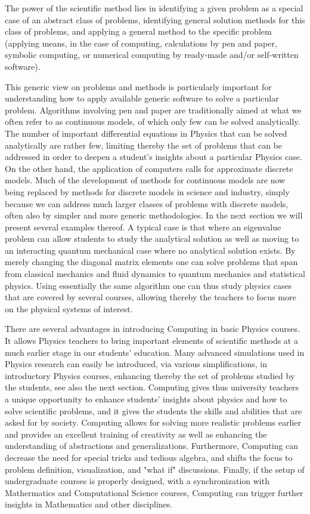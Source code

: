 \documentclass[graybox,envcountchap,sectrefs]{svmult}
\begin{document}
The power of the scientific method lies in identifying a given problem
as a special case of an abstract class of problems, identifying
general solution methods for this class of problems, and applying a
general method to the specific problem (applying means, in the case of
computing, calculations by pen and paper, symbolic computing, or
numerical computing by ready-made and/or self-written software). 

This generic view on problems and methods is particularly important for
understanding how to apply available generic software to solve a
particular problem.  Algorithms involving pen and paper are
traditionally aimed at what we often refer to as continuous models, of
which only few can be solved analytically. The number of important
differential equations in Physics that can be solved analytically are
rather few, limiting thereby the set of problems that can be addressed
in order to deepen a student's insights about a particular Physics
case. On the other hand, the application of computers calls for
approximate discrete models.  Much of the development of methods for
continuous models are now being replaced by methods for discrete
models in science and industry, simply because we can address much
larger classes of problems with discrete models, often also by simpler
and more generic methodologies.  In the next section we will present
several examples thereof. A typical case is that where an eigenvalue
problem can allow students to study the analytical solution as well as
moving to an interacting quantum mechanical case where no analytical
solution exists. By merely changing the diagonal matrix elements one
can solve problems that span from classical mechanics and fluid
dynamics to quantum mechanics and statistical physics.  Using
essentially the same algorithm one can thus study physics cases that
are covered by several courses, allowing thereby the teachers to focus
more on the physical systems of interest.

There are several advantages in  introducing Computing in basic Physics
courses. It allows Physics teachers to bring important elements of
scientific methods at a much earlier stage in our students'
education. Many advanced simulations used in Physics research can
easily be introduced, via various simplifications, in introductory
Physics courses, enhancing thereby the set of problems studied by the
students, see also the next section. Computing gives thus university
teachers a unique opportunity to enhance students' insights about
physics and how to solve scientific problems, and it gives the
students the skills and abilities that are asked for by
society. Computing allows for solving more realistic problems earlier
and provides an excellent training of creativity as well as enhancing the
understanding of abstractions and generalizations. Furthermore,
Computing can decrease the need for special tricks and tedious
algebra, and shifts the focus to problem definition, visualization,
and "what if" discussions. Finally, if the setup of undergraduate
courses is properly designed, with a synchronization with Mathermatics
and Computational Science courses, Computing can trigger further
insights in Mathematics and other disciplines. 
\end{document}
